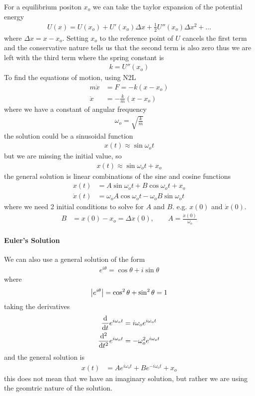 \documentclass[../main.tex]{subfiles}
\begin{document}
For a equilibrium positon $x_o$ we can take the taylor expansion of the potential energy
\begin{align*}
    U(x) = U(x_o) + U' (x_o) \Delta x + \frac{1}{2} U''(x_o) \Delta x^2 + \dots
\end{align*}
where $\Delta x = x - x_o$. Setting $x_o$ to the reference point of $U$ cancels the first term and
the conservative nature tells us that the second term is also zero thus we are left with the third
term where the spring constant is
\begin{align*}
    k = U'' (x_o)
\end{align*}
To find the equations of motion, using N2L
\begin{align*}
    m\ddot x &= F = - k (x - x_o) \\
    \ddot x &= - \frac{k}{m} (x - x_o)
\end{align*}
where we have a constant of angular frequency
\begin{align*}
    \omega_o = \sqrt{\frac{k}{m}}
\end{align*}
the solution could be a sinusoidal function
\begin{align*}
    x(t) \approx \sin \omega_o t 
\end{align*}
but we are missing the initial value, so
\begin{align*}
    x(t) \approx \sin \omega_o t + x_o
\end{align*}
the general solution is linear combinations of the sine and cosine functions
\begin{align*}
    x(t) &= A \sin \omega_o t + B \cos \omega_o t + x_o \\
    \dot x(t) &= \omega_o A \cos \omega_o t - \omega_o B \sin \omega_o t
\end{align*}
where we need 2 initial conditions to solve for $A$ and $B$. e.g. $x(0)$ and $\dot x(0)$.
\begin{align*}
    B &= x(0) - x_o = \Delta x(0), \qquad A = \frac{\dot x(0)}{\omega_o}
\end{align*}

\paragraph*{Euler's Solution} We can also use a general solution of the form
\begin{align*}
    e^{i \theta} = \cos \theta + i \sin \theta
\end{align*}
where
\begin{align*}
    \abs {e^{i \theta}} = \cos^2 \theta + \sin^2 \theta = 1
\end{align*}
taking the derivatives
\begin{align*}
    \dv{t} e^{i \omega_o t} &= i \omega_o e^{i \omega_o t} \\
    \dv[2]{t} e^{i \omega_o t} &= - \omega_o^2 e^{i \omega_o t}
\end{align*}
and the general solution is
\begin{align*}
    x(t) &= A e^{i \omega_o t} + B e^{-i \omega_o t} + x_o
\end{align*}
this does not mean that we have an imaginary solution, but rather we are using the geomtric 
nature of the solution. 
\end{document}

